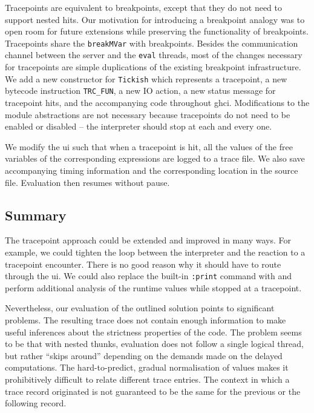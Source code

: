 \documentclass[thesis=B,english]{FITthesis}[2019/12/23]
\newcommand{\hsType}[1]{\texttt{#1}}
\newcommand{\hsIdent}[1]{\texttt{#1}}
\begin{document}
Tracepoints are equivalent to breakpoints, except that they do not need to
support nested hits. Our motivation for introducing a breakpoint analogy was to
open room for future extensions while preserving the functionality of
breakpoints. Tracepoints share the \hsIdent{breakMVar} with breakpoints.
Besides the communication channel between the server and the \texttt{eval}
threads, most of the changes necessary for tracepoints are simple duplications
of the existing breakpoint infrastructure.  We add a new constructor for
\hsType{Tickish} which represents a tracepoint, a new bytecode instruction
\texttt{TRC\_FUN}, a new IO action, a new status message for tracepoint hits,
and the accompanying code throughout \acrshort{ghci}. Modifications to the
module abstractions are not necessary because tracepoints do not need to be
enabled or disabled -- the interpreter should stop at each and every one.

We modify the \acrshort{ui} such that when a tracepoint is hit, all the values
of the free variables of the corresponding expressions are logged to a trace
file. We also save accompanying timing information and the corresponding
location in the source file. Evaluation then resumes without pause.

\subsection*{Summary}
The tracepoint approach could be extended and improved in many ways. For
example, we could tighten the loop between the interpreter and the reaction to
a tracepoint encounter. There is no good reason why it should have to route
through the \acrshort{ui}. We could also replace the built-in \texttt{:print}
command with  and perform additional analysis of the
runtime values while stopped at a tracepoint.

Nevertheless, our evaluation of the outlined solution points to significant
problems. The resulting trace does not contain enough information to make
useful inferences about the strictness properties of the code. The problem
seems to be that with nested thunks, evaluation does not follow a single
logical thread, but rather ``skips around'' depending on the demands made on
the delayed computations. The hard-to-predict, gradual normalisation of values
makes it prohibitively difficult to relate different trace entries. The context
in which a trace record originated is not guaranteed to be the same for the
previous or the following record.
\end{document}
